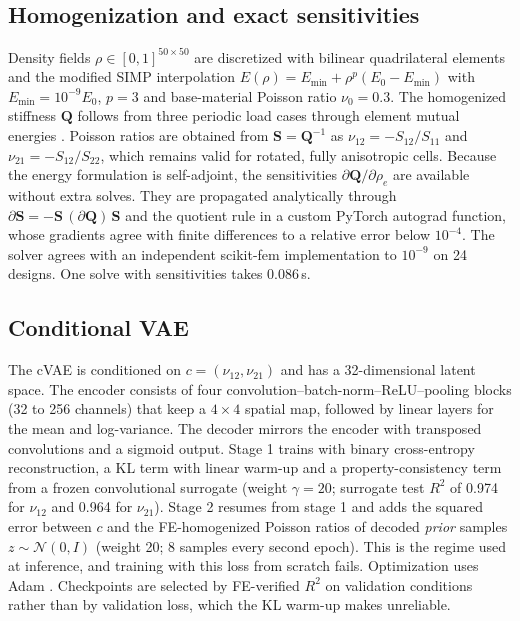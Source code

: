 \documentclass[a4paper,11pt]{article}
\newcommand{\nuot}{\nu_{12}}
\newcommand{\nuto}{\nu_{21}}
\newcommand{\RR}{R^2}
\begin{document}
\subsection{Homogenization and exact sensitivities}
Density fields $\rho\in[0,1]^{50\times50}$ are discretized with bilinear
quadrilateral elements and the modified SIMP interpolation
$E(\rho)=E_{\min}+\rho^{p}(E_0-E_{\min})$ with $E_{\min}=10^{-9}E_0$, $p=3$
and base-material Poisson ratio $\nu_0=0.3$. The homogenized stiffness
$\mathbf{Q}$ follows from three periodic load cases through element mutual
energies \citep{xia2015design}. Poisson ratios are obtained from
$\mathbf{S}=\mathbf{Q}^{-1}$ as $\nuot=-S_{12}/S_{11}$ and
$\nuto=-S_{12}/S_{22}$, which remains valid for rotated, fully anisotropic
cells. Because the energy formulation is self-adjoint, the sensitivities
$\partial\mathbf{Q}/\partial\rho_e$ are available without extra solves.
They are propagated analytically through
$\partial\mathbf{S}=-\mathbf{S}\,(\partial\mathbf{Q})\,\mathbf{S}$ and the
quotient rule in a custom PyTorch \citep{paszke2019pytorch} autograd
function, whose gradients agree with finite differences to a relative error
below $10^{-4}$. The solver agrees with an independent scikit-fem
\citep{gustafsson2020skfem} implementation to $10^{-9}$ on 24 designs. One
solve with sensitivities takes 0.086\,s.

\subsection{Conditional VAE}
The cVAE \citep{kingma2014vae,sohn2015cvae} is conditioned on
$c=(\nuot,\nuto)$ and has a 32-dimensional latent space. The encoder
consists of four convolution--batch-norm--ReLU--pooling blocks (32 to 256
channels) that keep a $4\times4$ spatial map, followed by linear layers for
the mean and log-variance. The decoder mirrors the encoder with transposed
convolutions and a sigmoid output. Stage 1 trains with binary cross-entropy
reconstruction, a KL term with linear warm-up \citep{bowman2016generating}
and a property-consistency term from a frozen convolutional surrogate
(weight $\gamma=20$; surrogate test $\RR$ of 0.974 for $\nuot$ and 0.964 for
$\nuto$). Stage 2 resumes from stage 1 and adds the squared error between
$c$ and the FE-homogenized Poisson ratios of decoded \emph{prior} samples
$z\sim\mathcal N(0,I)$ (weight 20; 8 samples every second epoch). This is
the regime used at inference, and training with this loss from scratch
fails. Optimization uses Adam \citep{kingma2015adam}. Checkpoints are
selected by FE-verified $\RR$ on validation conditions rather than by
validation loss, which the KL warm-up makes unreliable.
\end{document}
